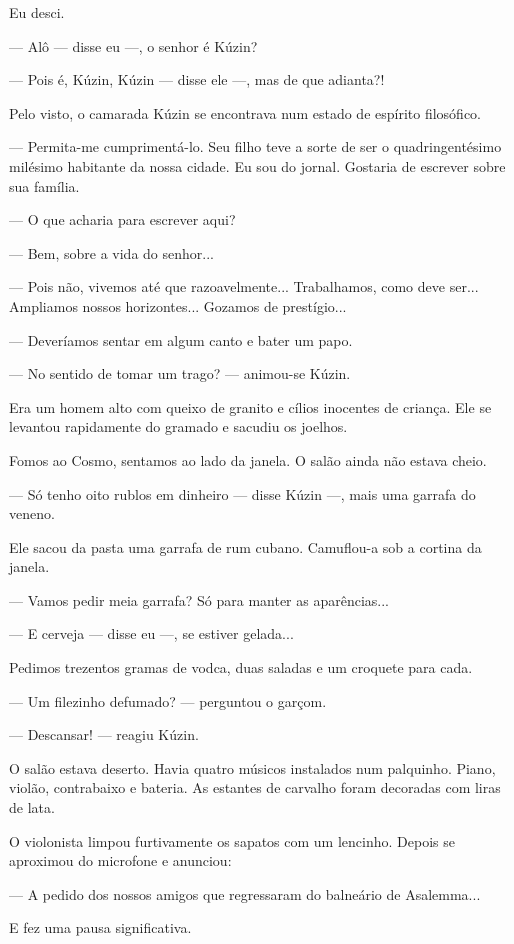 Eu desci.

--- Alô --- disse eu ---, o senhor é Kúzin?

--- Pois é, Kúzin, Kúzin --- disse ele ---, mas de que adianta?!

Pelo visto, o camarada Kúzin se encontrava num estado de espírito
filosófico.

--- Permita-me cumprimentá-lo. Seu filho teve a sorte de ser o
quadringentésimo milésimo habitante da nossa cidade. Eu sou do jornal.
Gostaria de escrever sobre sua família.

--- O que acharia para escrever aqui?

--- Bem, sobre a vida do senhor...

--- Pois não, vivemos até que razoavelmente... Trabalhamos, como deve
ser... Ampliamos nossos horizontes... Gozamos de prestígio...

--- Deveríamos sentar em algum canto e bater um papo.

--- No sentido de tomar um trago? --- animou-se Kúzin.

Era um homem alto com queixo de granito e cílios inocentes de criança.
Ele se levantou rapidamente do gramado e sacudiu os joelhos.

Fomos ao Cosmo, sentamos ao lado da janela. O salão ainda não estava
cheio.

--- Só tenho oito rublos em dinheiro --- disse Kúzin ---, mais uma
garrafa do veneno.

Ele sacou da pasta uma garrafa de rum cubano. Camuflou-a sob a cortina
da janela.

--- Vamos pedir meia garrafa? Só para manter as aparências...

--- E cerveja --- disse eu ---, se estiver gelada...

Pedimos trezentos gramas de vodca, duas saladas e um croquete para cada.

--- Um filezinho defumado? --- perguntou o garçom.

--- Descansar! --- reagiu Kúzin.

O salão estava deserto. Havia quatro músicos instalados num palquinho.
Piano, violão, contrabaixo e bateria. As estantes de carvalho foram
decoradas com liras de lata.

O violonista limpou furtivamente os sapatos com um lencinho. Depois se
aproximou do microfone e anunciou:

--- A pedido dos nossos amigos que regressaram do balneário de
Asalemma...

E fez uma pausa significativa.

